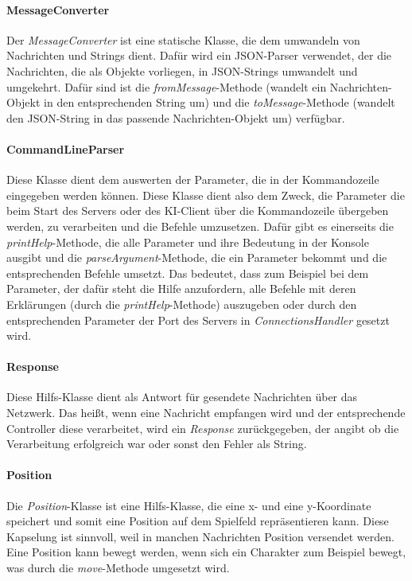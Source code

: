 \documentclass[12pt]{article}
\newcommand{\class}[1]{\textit{#1}-Klasse}
\newcommand{\method}[1]{\textit{#1}-Methode}
\newcounter{fa}
\begin{document}
\paragraph{MessageConverter}
Der \textit{MessageConverter} ist eine statische Klasse, die dem umwandeln von Nachrichten und Strings dient. Dafür wird ein JSON-Parser verwendet, der die Nachrichten, die als Objekte vorliegen, in JSON-Strings umwandelt und umgekehrt. Dafür sind ist die \method{fromMessage} (wandelt ein Nachrichten-Objekt in den entsprechenden String um) und die \method{toMessage} (wandelt den JSON-String in das passende Nachrichten-Objekt um) verfügbar.

\paragraph{CommandLineParser}
Diese Klasse dient dem auswerten der Parameter, die in der Kommandozeile eingegeben werden können. Diese Klasse dient also dem Zweck, die Parameter die beim Start des Servers oder des KI-Client über die Kommandozeile übergeben werden, zu verarbeiten und die Befehle umzusetzen. Dafür gibt es einerseits die \method{printHelp}, die alle Parameter und ihre Bedeutung in der Konsole ausgibt und die \method{parseArgument}, die ein Parameter bekommt und die entsprechenden Befehle umsetzt. Das bedeutet, dass zum Beispiel bei dem Parameter, der dafür steht die Hilfe anzufordern, alle Befehle mit deren Erklärungen (durch die \method{printHelp}) auszugeben oder durch den entsprechenden Parameter der Port des Servers in \textit{ConnectionsHandler} gesetzt wird. 

\paragraph{Response}
Diese Hilfs-Klasse dient als Antwort für gesendete Nachrichten über das Netzwerk. Das heißt, wenn eine Nachricht empfangen wird und der entsprechende Controller diese verarbeitet, wird ein \textit{Response} zurückgegeben, der angibt ob die Verarbeitung erfolgreich war oder sonst den Fehler als String. 

\paragraph{Position}
Die \class{Position} ist eine Hilfs-Klasse, die eine x- und eine y-Koordinate speichert und somit eine Position auf dem Spielfeld repräsentieren kann. Diese Kapselung ist sinnvoll, weil in manchen Nachrichten Position versendet werden. Eine Position kann bewegt werden, wenn sich ein Charakter zum Beispiel bewegt, was durch die \method{move} umgesetzt wird. 
\end{document}
